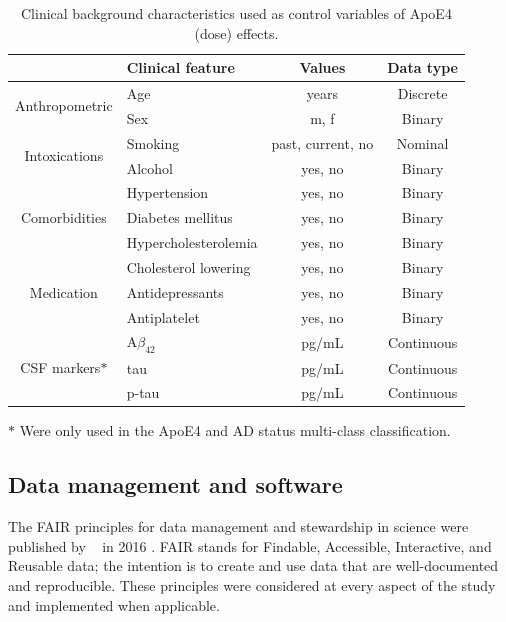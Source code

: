 \documentclass{amsart}
\begin{document}
\begin{table}[htb]
\caption{Clinical background characteristics used as control variables of ApoE4 (dose) effects.}
\label{tab:clin}
\begin{threeparttable}
\begin{tabular}{clcc} \toprule
                                & \textbf{Clinical feature}   & \textbf{Values} & \textbf{Data type} \\ \midrule
\multirow{2}{*}{Anthropometric} & Age                   & years   & Discrete   \\
                                & Sex                   & m, f    & Binary     \\
\multirow{2}{*}{Intoxications}  & Smoking               & past, current, no & Nominal\\
                                & Alcohol               & yes, no & Binary     \\
\multirow{3}{*}{Comorbidities}  & Hypertension          & yes, no & Binary     \\
                                & Diabetes mellitus     & yes, no & Binary     \\
                                & Hypercholesterolemia  & yes, no & Binary     \\
\multirow{3}{*}{Medication}     & Cholesterol lowering  & yes, no & Binary     \\
                                & Antidepressants       & yes, no & Binary     \\
                                & Antiplatelet          & yes, no & Binary     \\
\multirow{3}{*}{CSF markers$\ast$} & A$\beta_{42}$      & pg/mL   & Continuous \\
                                & tau                   & pg/mL   & Continuous \\
                                & p-tau                 & pg/mL   & Continuous \\\bottomrule
\end{tabular}
\begin{tablenotes}
  \item[$\ast$] Were only used in the ApoE4 and AD status multi-class classification.
\end{tablenotes}
\end{threeparttable}
\end{table}

\subsection{Data management and software}\label{datamanagement}
The FAIR principles for data management and stewardship in science were published by  ~\citeauthor{Wilkinson2016TheStewardship} in 2016 \cite{Wilkinson2016TheStewardship}. FAIR stands for Findable, Accessible, Interactive, and Reusable data; the intention is to create and use data that are well-documented and reproducible. These principles were considered at every aspect of the study and implemented when applicable.
\end{document}
